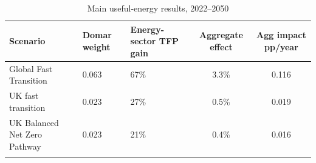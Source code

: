 \begin{longtable}{lllcc}
\caption{Main useful-energy results, 2022--2050} \\ 
  \hline
Scenario & Domar weight & Energy-sector TFP gain & Aggregate effect & Agg impact pp/year \\ 
  \hline
Global Fast Transition & 0.063 & 67\% & 3.3\% & 0.116 \\ 
  UK fast transition & 0.023 & 27\% & 0.5\% & 0.019 \\ 
  UK Balanced Net Zero Pathway & 0.023 & 21\% & 0.4\% & 0.016 \\ 
   \hline
\hline
\label{tab:energy_main_useful}
\end{longtable}

